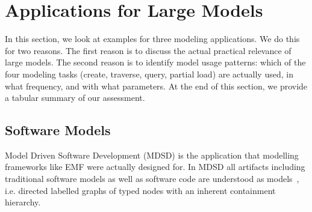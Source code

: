 \section{Applications for Large Models}
\label{sec:applications}

In this section, we look at examples for three modeling applications. We do this for two reasons. The first reason is to discuss the actual practical relevance of large models. The second reason is to identify model usage patterns: which of the four modeling tasks (create, traverse, query, partial load) are actually used, in what frequency, and with what parameters. At the end of this section, we provide a tabular summary of our assessment.

%
%
%

\subsection{Software Models}
Model Driven Software Development (MDSD) is the application that modelling frameworks like EMF were actually designed for. In MDSD all artifacts including traditional software models as well as software code are understood as models~\cite{modelsAsCode}, i.e. directed labelled graphs of typed nodes with an inherent containment hierarchy. 

